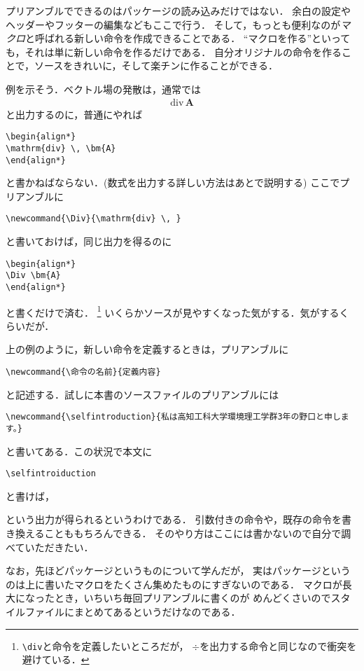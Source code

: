 プリアンブルでできるのはパッケージの読み込みだけではない．
余白の設定やヘッダーやフッターの編集などもここで行う．
そして，もっとも便利なのが\emph{マクロ}と呼ばれる新しい命令を作成できることである．
``マクロを作る''といっても，それは単に新しい命令を作るだけである．
自分オリジナルの命令を作ることで，ソースをきれいに，そして楽チンに作ることができる．

例を示そう．ベクトル場の発散は，通常では
\begin{align*}
\mathrm{div} \, \bm{A}
\end{align*}
と出力するのに，普通にやれば
\begin{verbatim}
\begin{align*}
\mathrm{div} \, \bm{A}
\end{align*}
\end{verbatim}
と書かねばならない．(数式を出力する詳しい方法はあとで説明する)
ここでプリアンブルに
\begin{verbatim}
\newcommand{\Div}{\mathrm{div} \, }
\end{verbatim}
と書いておけば，同じ出力を得るのに
\begin{verbatim}
\begin{align*}
\Div \bm{A}
\end{align*}
\end{verbatim}
と書くだけで済む．
\footnote{\verb|\div|と命令を定義したいところだが，
$\div$を出力する命令と同じなので衝突を避けている．}
いくらかソースが見やすくなった気がする．気がするくらいだが．

上の例のように，新しい命令を定義するときは，プリアンブルに
\begin{verbatim}
\newcommand{\命令の名前}{定義内容}
\end{verbatim}
と記述する．試しに本書のソースファイルのプリアンブルには
\begin{verbatim}
\newcommand{\selfintroduction}{私は高知工科大学環境理工学群3年の野口と申します。}
\end{verbatim}
と書いてある．この状況で本文に
\begin{verbatim}
\selfintroiduction
\end{verbatim}
と書けば，
\begin{center}
\selfintroduction
\end{center}
という出力が得られるというわけである．
引数付きの命令や，既存の命令を書き換えることももちろんできる．
そのやり方はここには書かないので自分で調べていただきたい．

なお，先ほどパッケージというものについて学んだが，
実はパッケージというのは上に書いたマクロをたくさん集めたものにすぎないのである．
マクロが長大になったとき，いちいち毎回プリアンブルに書くのが
めんどくさいのでスタイルファイルにまとめてあるというだけなのである．
